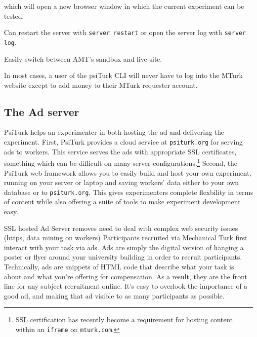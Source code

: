 \documentclass[twocolumn]{svjour3}          %
\begin{document}
\noindent which will open a new browser window in which the current experiment can be tested.

Can restart the server with \texttt{server restart} or open the server log with \texttt{server log}. 

Easily switch between AMT's sandbox and live site.

In most cases, a user of the
psiTurk CLI will never have to log into the MTurk website except to add money to their MTurk
requester account.


\subsection{The Ad server}

PsiTurk helps an experimenter in both hosting the ad and delivering the experiment.
First, PsiTurk provides a cloud service at \texttt{psiturk.org} for serving ads to workers.
This service serves the ads with appropriate SSL certificates, something which can be difficult on many server configurations.\footnote{SSL certification has recently become a requirement for hosting content within an \texttt{iframe} on \texttt{mturk.com}.}
Second, the PsiTurk web framework allows you to easily build and host your own experiment, running on your server or laptop and saving workers' data either to your own database  or to \texttt{psiturk.org}.
This gives experimenters complete flexbility in terms of content while also offering a suite of tools to make experiment development easy.

SSL hosted Ad Server removes need to deal with complex web security issues (https, data mining on workers) 
Participants recruited via Mechanical Turk first interact with your task via ads. Ads are simply the digital version of hanging a poster or flyer around your university building in order to recruit participants. Technically, ads are snippets of HTML code that describe what your task is about and what you're offering for compensation. As a result, they are the front line for any subject recruitment online. It's easy to overlook the importance of a good ad, and making that ad visible to as many participants as possible.




%
%
%
%
%
\end{document}
